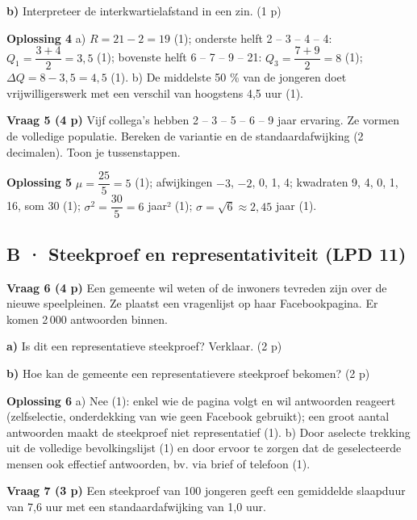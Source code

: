 \textbf{b)} Interpreteer de interkwartielafstand in een zin. (1 p) \lijn

\begin{oplossing}
\textbf{Oplossing 4} \quad a) $R=21-2=19$ (1); onderste helft 2 – 3 – 4 – 4: $Q_1=\dfrac{3+4}{2}=3{,}5$ (1); bovenste helft 6 – 7 – 9 – 21: $Q_3=\dfrac{7+9}{2}=8$ (1); $\Delta Q=8-3{,}5=4{,}5$ (1). b) De middelste 50 \% van de jongeren doet vrijwilligerswerk met een verschil van hoogstens 4,5 uur (1).
\end{oplossing}

\textbf{Vraag 5 \quad (4 p)} Vijf collega’s hebben 2 – 3 – 5 – 6 – 9 jaar ervaring. Ze vormen de volledige populatie. Bereken de variantie en de standaardafwijking (2 decimalen). Toon je tussenstappen. \lijn

\begin{oplossing}
\textbf{Oplossing 5} \quad $\mu=\dfrac{25}{5}=5$ (1); afwijkingen $-3$, $-2$, 0, 1, 4; kwadraten 9, 4, 0, 1, 16, som 30 (1); $\sigma^2=\dfrac{30}{5}=6$ jaar² (1); $\sigma=\sqrt{6}\approx 2{,}45$ jaar (1).
\end{oplossing}

\subsection*{B · Steekproef en representativiteit (LPD 11)}

\textbf{Vraag 6 \quad (4 p)} Een gemeente wil weten of de inwoners tevreden zijn over de nieuwe speelpleinen. Ze plaatst een vragenlijst op haar Facebookpagina. Er komen 2\,000 antwoorden binnen.

\textbf{a)} Is dit een representatieve steekproef? Verklaar. (2 p) \lijn

\textbf{b)} Hoe kan de gemeente een representatievere steekproef bekomen? (2 p) \lijn

\begin{oplossing}
\textbf{Oplossing 6} \quad a) Nee (1): enkel wie de pagina volgt en wil antwoorden reageert (zelfselectie, onderdekking van wie geen Facebook gebruikt); een groot aantal antwoorden maakt de steekproef niet representatief (1). b) Door aselecte trekking uit de volledige bevolkingslijst (1) en door ervoor te zorgen dat de geselecteerde mensen ook effectief antwoorden, bv. via brief of telefoon (1).
\end{oplossing}

\textbf{Vraag 7 \quad (3 p)} Een steekproef van 100 jongeren geeft een gemiddelde slaapduur van 7,6 uur met een standaardafwijking van 1,0 uur.

